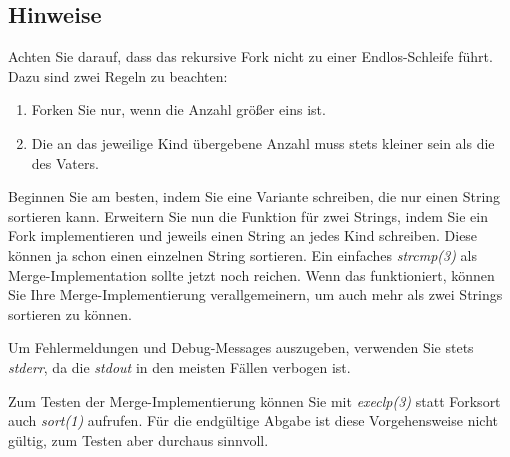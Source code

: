 \subsection*{Hinweise}
Achten Sie darauf, dass das rekursive Fork nicht zu einer Endlos-Schleife führt.
Dazu sind zwei Regeln zu beachten:
\begin{enumerate}
\item Forken Sie nur, wenn die Anzahl größer eins ist.
\item Die an das jeweilige Kind übergebene Anzahl muss stets kleiner sein als
  die des Vaters.
\end{enumerate}
Beginnen Sie am besten, indem Sie eine Variante schreiben, die nur einen String
sortieren kann. Erweitern Sie nun die Funktion für zwei Strings, indem Sie ein
Fork implementieren und jeweils einen String an jedes Kind schreiben. Diese
können ja schon einen einzelnen String sortieren. Ein einfaches
\emph{strcmp(3)} als Merge-Implementation sollte jetzt noch reichen. Wenn das
funktioniert, können Sie Ihre Merge-Implementierung verallgemeinern, um auch
mehr als zwei Strings sortieren zu können.

Um Fehlermeldungen und Debug-Messages auszugeben, verwenden Sie stets
\emph{stderr}, da die \emph{stdout} in den meisten Fällen verbogen ist.

Zum Testen der Merge-Implementierung können Sie mit \emph{execlp(3)} statt
Forksort auch \emph{sort(1)} aufrufen. Für die endgültige Abgabe ist diese
Vorgehensweise nicht gültig, zum Testen aber durchaus sinnvoll.

\osueguidelinestwo


